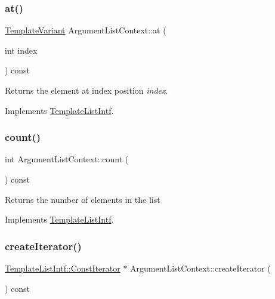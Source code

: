\subsubsection{\texorpdfstring{at()}{at()}}
{\footnotesize\ttfamily \mbox{\hyperlink{class_template_variant}{Template\+Variant}} Argument\+List\+Context\+::at (\begin{DoxyParamCaption}\item[{int}]{index }\end{DoxyParamCaption}) const\hspace{0.3cm}{\ttfamily [virtual]}}

Returns the element at index position {\itshape index}. 

Implements \mbox{\hyperlink{class_template_list_intf_aa51e57e72eacf4e8ce1055ee30a0f7f8}{Template\+List\+Intf}}.

\mbox{\label{class_argument_list_context_a178ceda7e6b509e85aecc898ebefe1ed}} 
\subsubsection{\texorpdfstring{count()}{count()}}
{\footnotesize\ttfamily int Argument\+List\+Context\+::count (\begin{DoxyParamCaption}{ }\end{DoxyParamCaption}) const\hspace{0.3cm}{\ttfamily [virtual]}}

Returns the number of elements in the list 

Implements \mbox{\hyperlink{class_template_list_intf_a329e49e33484c2aa5106aac1bf4e5216}{Template\+List\+Intf}}.

\mbox{\label{class_argument_list_context_aeba72b5aa63d93c1444448170b5c6612}} 
\subsubsection{\texorpdfstring{createIterator()}{createIterator()}}
{\footnotesize\ttfamily \mbox{\hyperlink{class_template_list_intf_1_1_const_iterator}{Template\+List\+Intf\+::\+Const\+Iterator}} $\ast$ Argument\+List\+Context\+::create\+Iterator (\begin{DoxyParamCaption}{ }\end{DoxyParamCaption}) const\hspace{0.3cm}{\ttfamily [virtual]}}

